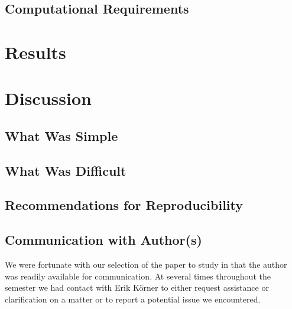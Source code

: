 \documentclass[conference]{IEEEtran}
\begin{document}
\subsection{Computational Requirements}

\section{Results}

\section{Discussion}

\subsection{What Was Simple}

\subsection{What Was Difficult}

\subsection{Recommendations for Reproducibility}

\subsection{Communication with Author(s)}
We were fortunate with our selection of the paper to study in that the author was readily available for communication. At several times throughout the semester we had contact with Erik K\"{o}rner to either request assistance or clarification on a matter or to report a potential issue we encountered.




\vspace{12pt}
\end{document}
